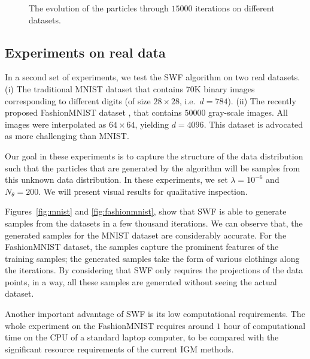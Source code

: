 \begin{figure*}[t]
\centering
{}\hfill
{}
\caption{The evolution of the particles through $15000$ iterations on different datasets.}
\end{figure*}

\subsection{Experiments on real data}

%
In a second set of experiments, we test the SWF algorithm on two real datasets. (i) The traditional MNIST dataset that contains 70K binary images corresponding to different digits (of size $28 \times 28$, i.e.\ $d = 784$). (ii) The recently proposed FashionMNIST dataset \cite{xiao2017fashion}, that contains $50000$ gray-scale images. All images were interpolated as $64\times 64$, yielding $d=4096$. This dataset is advocated as more challenging than MNIST.

Our goal in these experiments is to capture the structure of the data distribution such that the particles that are generated by the algorithm will be samples from this unknown data distribution. In these experiments, we set $\lambda=10^{-6}$ and $N_\theta=200$. We will present visual results for qualitative inspection. %

Figures~\ref{fig:mnist} and \ref{fig:fashionmnist}, show that SWF is able to generate samples from the datasets in a few thousand iterations. We can observe that, the generated samples for the MNIST dataset are considerably accurate. For the FashionMNIST dataset, the samples capture the prominent features of the training samples; the generated samples take the form of various clothings along the iterations. By considering that SWF only requires the projections of the data points, in a way, all these samples are generated without seeing the actual dataset.




Another important advantage of SWF is its low computational requirements. The whole experiment on the FashionMNIST requires around $1$ hour of computational time on the CPU of a standard laptop computer, to be compared with the significant resource requirements of the current IGM methods.



















